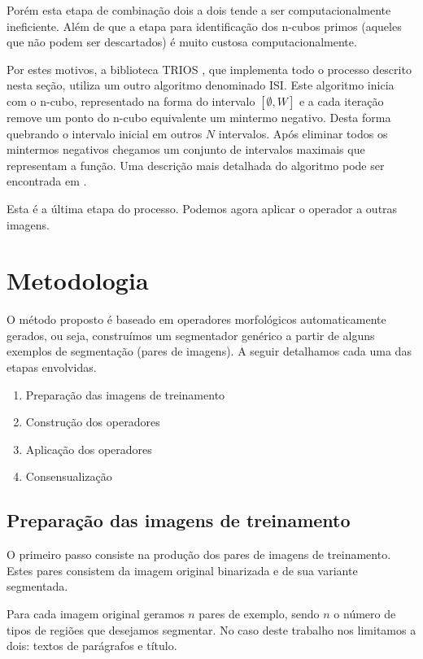 \documentclass[a4paper,11pt]{article}
\begin{document}
Porém esta etapa de combinação dois a dois tende a ser computacionalmente ineficiente. Além de que a etapa para identificação dos n-cubos primos (aqueles que não podem ser descartados) é muito custosa computacionalmente.

Por estes motivos, a biblioteca TRIOS \cite{dostrios}, que implementa todo o processo descrito nesta seção, utiliza um outro algoritmo denominado ISI. Este algoritmo inicia com o n-cubo, representado na forma do intervalo $[\emptyset, W]$ e a cada iteração remove um ponto do n-cubo equivalente um mintermo negativo. Desta forma quebrando o intervalo inicial em outros $N$ intervalos. Após eliminar todos os mintermos negativos chegamos um conjunto de intervalos maximais que representam a função. Uma descrição mais detalhada do algoritmo pode ser encontrada em \cite{Tomita:1996:PrAuMa}.

Esta é a última etapa do processo. Podemos agora aplicar o operador a outras imagens.

\clearpage

\section{Metodologia}
\label{sec:metodologia}

O método proposto é baseado em operadores morfológicos automaticamente gerados, ou seja, construímos um segmentador genérico a partir de alguns exemplos de segmentação (pares de imagens). A seguir detalhamos cada uma das etapas envolvidas.

    \begin{enumerate}
      \item Preparação das imagens de treinamento
      \item Construção dos operadores
      \item Aplicação dos operadores
      \item Consensualização
    \end{enumerate}

    \subsection{Preparação das imagens de treinamento}

      O primeiro passo consiste na produção dos pares de imagens de treinamento. Estes pares consistem da imagem original binarizada e de sua variante segmentada.

      Para cada imagem original geramos $n$ pares de exemplo, sendo $n$ o número de tipos de regiões que desejamos segmentar. No caso deste trabalho nos limitamos a dois: textos de parágrafos e título.
\end{document}
